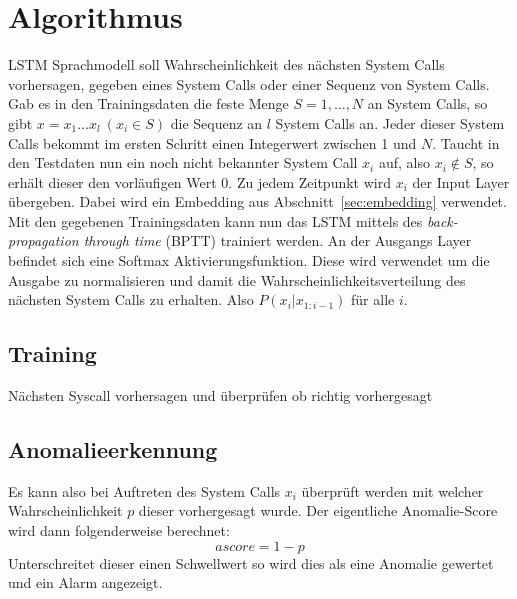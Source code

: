     \section{Algorithmus}\label{sec:Algorithmus}
        \ac{LSTM} Sprachmodell soll Wahrscheinlichkeit des nächsten System Calls vorhersagen, gegeben eines System Calls oder einer Sequenz von System Calls.
        Gab es in den Trainingsdaten die feste Menge $S = {1,\dots,N}$ an System Calls, so gibt $x=x_1\dots x_l \ (x_i\in S)$ die Sequenz an $l$ System Calls an.
        Jeder dieser System Calls bekommt im ersten Schritt einen Integerwert zwischen 1 und $N$.
        Taucht in den Testdaten nun ein noch nicht bekannter System Call $x_i$ auf, also $x_i \notin S$, so erhält dieser den vorläufigen Wert 0.
        Zu jedem Zeitpunkt wird $x_i$ der Input Layer übergeben.
        Dabei wird ein Embedding aus Abschnitt~\ref{sec:embedding} verwendet. 
        Mit den gegebenen Trainingsdaten kann nun das \ac{LSTM} mittels des \textit{back-propagation through time} (BPTT) trainiert werden.
        An der Ausgangs Layer befindet sich eine Softmax Aktivierungsfunktion.
        Diese wird verwendet um die Ausgabe zu normalisieren und damit die Wahrscheinlichkeitsverteilung des nächsten System Calls zu erhalten.
        Also $P\left(x_i|x_{1:i-1}\right)$ für alle $i$. 
        

        \subsection{Training}\label{sec:Training}
            Nächsten Syscall vorhersagen und überprüfen ob richtig vorhergesagt
        \subsection{Anomalieerkennung}\label{sec:Anomalieerkennung}
            Es kann also bei Auftreten des System Calls $x_i$ überprüft werden mit welcher Wahrscheinlichkeit $p$ dieser vorhergesagt wurde.
            Der eigentliche Anomalie-Score wird dann folgenderweise berechnet:
            \begin{equation}
                ascore = 1 - p
            \end{equation}
            Unterschreitet dieser einen Schwellwert so wird dies als eine Anomalie gewertet und ein Alarm angezeigt.
